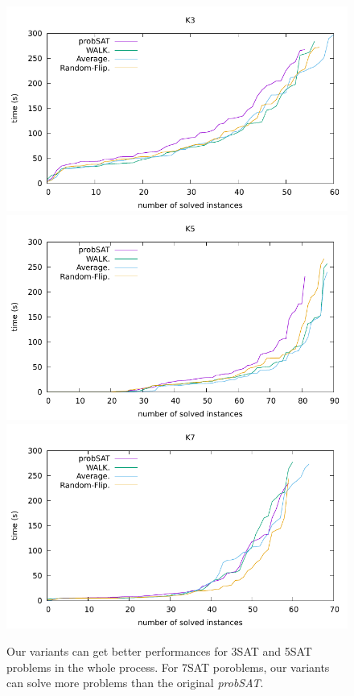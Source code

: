 \documentclass[12pt,a4paper,twoside]{scrartcl}
\numberwithin{equation}{section}
\begin{document}
  \begin{figure}[H]
\begin{center}
  \includegraphics[scale = 1]{DATA/K3/e4.pdf}
    \includegraphics[scale = 1]{DATA/K5/e4.pdf}
  \includegraphics[scale =1]{DATA/K7/e4.pdf}
  \end{center}
  \label{Experiment 9 k3 cactus plot}
  \end{figure}
  \begin{figure}[H]
\begin{center}

  \end{center}
  \caption{Our variants can get better performances for 3SAT and 5SAT problems in the whole process. For 7SAT poroblems, our variants can solve more problems than the original \emph{probSAT}. }
  \label{Experiment 9 k5 cactus plot}
  \end{figure}
  \clearpage
\end{document}
